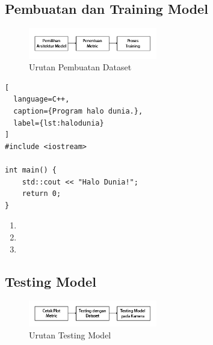\lipsum[9-10]

\subsection{Pembuatan dan Training Model}
\label{subsec:model}

\lipsum[11]

\begin{figure} [ht]
  \centering
  \includegraphics[width=0.5\textwidth]{gambar/model.jpg}

  \caption{Urutan Pembuatan Dataset}
  \label{fig:model}
\end{figure}

\begin{lstlisting}[
  language=C++,
  caption={Program halo dunia.},
  label={lst:halodunia}
]
#include <iostream>

int main() {
    std::cout << "Halo Dunia!";
    return 0;
}
\end{lstlisting}

\lipsum[12]

\begin{enumerate}
  \item \lipsum[13][1-4]
  \item \lipsum[13][5-8]
  \item \lipsum[13][9-12]
\end{enumerate}

\lipsum[14-15]

\subsection{Testing Model}
\label{subsec:testing}

\lipsum[11]

\begin{figure} [ht]
  \centering
  \includegraphics[width=0.5\textwidth]{gambar/testing.jpg}

  \caption{Urutan Testing Model}
  \label{fig:testing}
\end{figure}
